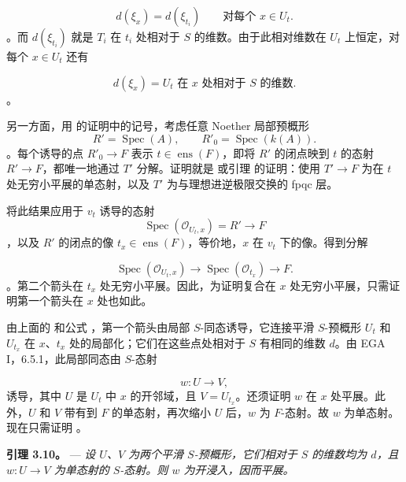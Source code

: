  \[
  d(\xi_x)=d(\xi_{t_i})
  \qquad\text{对每个 }x\in U_t.
\]。而 \(d(\xi_{t_i})\) 就是 \(T_i\) 在 \(t_i\) 处相对于 \(S\) 的维数。由于此相对维数在 \(U_t\) 上恒定，对每个 \(x\in U_t\) 还有

 \[
  \tag{*}
  d(\xi_x)=\text{\(U_t\) 在 \(x\) 处相对于 \(S\) 的维数}.
\]。

另一方面，用  的证明中的记号，考虑任意 Noether 局部预概形 \[
  R'=\operatorname{Spec}(A),
  \qquad
  R'_0=\operatorname{Spec}(k(A)).
\]。每个诱导的点 \(R'_0\to F\) 表示 \(t\in\operatorname{ens}(F)\)，即将 \(R'\) 的闭点映到 \(t\) 的态射 \(R'\to F\)，都唯一地通过 \(T'\) 分解。证明就是  或引理  的证明：使用 \(T'\to F\) 为在 \(t\) 处无穷小平展的单态射，以及 \(T'\) 为与理想进逆极限交换的 fpqc 层。

将此结果应用于 \(v_t\) 诱导的态射 \[
  \operatorname{Spec}(\mathscr O_{U_t,x})=R'\longrightarrow F
\]，以及 \(R'\) 的闭点的像 \(t_x\in\operatorname{ens}(F)\)，等价地，\(x\) 在 \(v_t\) 下的像。得到分解

 \[
  \operatorname{Spec}(\mathscr O_{U_t,x})
  \longrightarrow
  \operatorname{Spec}(\mathscr O_{t_x})
  \longrightarrow F.
\]。第二个箭头在 \(t_x\) 处无穷小平展。因此，为证明复合在 \(x\) 处无穷小平展，只需证明第一个箭头在 \(x\) 处也如此。

由上面的  和公式 ，第一个箭头由局部 \(S\)-同态诱导，它连接平滑 \(S\)-预概形 \(U_t\) 和 \(U_{t_x}\) 在 \(x\)、\(t_x\) 处的局部化；它们在这些点处相对于 \(S\) 有相同的维数 \(d\)。由 EGA I，6.5.1，此局部同态由 \(S\)-态射

 \[
  w:U\longrightarrow V,
\] 诱导，其中 \(U\) 是 \(U_t\) 中 \(x\) 的开邻域，且 \(V=U_{t_x}\)。还须证明 \(w\) 在 \(x\) 处平展。此外，\(U\) 和 \(V\) 带有到 \(F\) 的单态射，再次缩小 \(U\) 后，\(w\) 为 \(F\)-态射。故 \(w\) 为单态射。现在只需证明 。

\medskip\noindent{}\textbf{引理 3.10。} --- \textit{设 \(U\)、\(V\) 为两个平滑 \(S\)-预概形，它们相对于 \(S\) 的维数均为 \(d\)，且 \(w:U\to V\) 为单态射的 \(S\)-态射。则 \(w\) 为开浸入，因而平展。}


